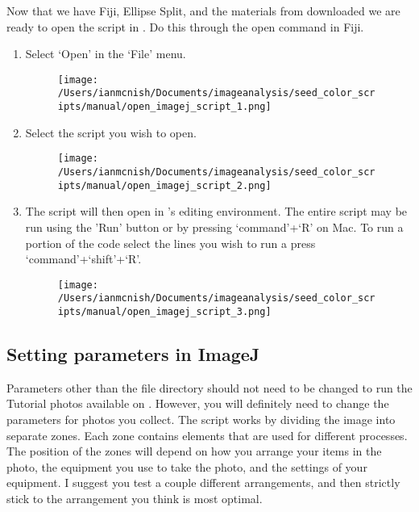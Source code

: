 \documentclass[12pt]{article}
\begin{document}
\noindent Now that we have Fiji, Ellipse Split, and the materials from  downloaded we are ready to open the script in . Do this through the open command in Fiji.\\

\begin{enumerate}

\item Select `Open' in the `File' menu.\\

\begin{figure}[H]
	\centering
	\texttt{[image: /Users/ianmcnish/Documents/imageanalysis/seed\_color\_scripts/manual/open\_imagej\_script\_1.png]}
	\label{fig:open_imagej_script_1}
\end{figure}

\item Select the script you wish to open.\\

\begin{figure}[H]
	\centering
	\texttt{[image: /Users/ianmcnish/Documents/imageanalysis/seed\_color\_scripts/manual/open\_imagej\_script\_2.png]}
	\label{fig:open_imagej_script_2}
\end{figure}

\item The script will then open in 's editing environment. The entire script may be run using the 'Run' button or by pressing `command'+`R' on Mac. To run a portion of the code select the lines you wish to run a press `command'+`shift'+`R'.\\

\begin{figure}[H]
	\centering
	\texttt{[image: /Users/ianmcnish/Documents/imageanalysis/seed\_color\_scripts/manual/open\_imagej\_script\_3.png]}
	\label{fig:open_imagej_script_3}
\end{figure}

\end{enumerate}

\subsection{Setting parameters in ImageJ}\label{sec:parameters}

\noindent Parameters other than the file directory should not need to be changed to run the Tutorial photos available on . However, you will definitely need to change the parameters for photos you collect. The script works by dividing the image into separate zones. Each zone contains elements that are used for different processes. The position of the zones will depend on how you arrange your items in the photo, the equipment you use to take the photo, and the settings of your equipment. I suggest you test a couple different arrangements, and then strictly stick to the arrangement you think is most optimal.
\end{document}
